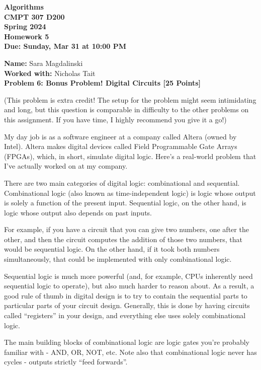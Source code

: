 \documentclass[12pt]{article}
\newcommand{\Name}[1]{\noindent \textbf{Name:} #1 \\}
\newcommand{\Workedwith}[1]{\noindent \textbf{Worked with:} #1 \\}
\newcommand{\Problem}[3]{\mbox{} \newline \noindent \textbf{\textbf{Problem #1: #2 [#3 Points] \\ }}}
\begin{document}
\begin{center}
  \bf
  Algorithms \\
  CMPT 307 D200 \\
  Spring 2024 \\
  \rm
  Homework 5\\
  Due:  Sunday, Mar 31 at 10:00 PM \\
\end{center}

\Name{Sara Magdalinski}
\Workedwith{Nicholas Tait}

\Problem{6}{Bonus Problem! Digital Circuits}{25}

(This problem is extra credit! The setup for the problem might seem intimidating and long, but this question is comparable in difficulty to the other problems on this assignment. If you have time, I highly recommend you give it a go!)

My day job is as a software engineer at a company called Altera (owned by Intel).
Altera makes digital devices called Field Programmable Gate Arrays (FPGAs), which, in short, simulate digital logic.
Here's a real-world problem that I've actually worked on at my company.

There are two main categories of digital logic: combinational and sequential.
Combinational logic (also known as time-independent logic) is logic whose output is solely a function of the present input.
Sequential logic, on the other hand, is logic whose output also depends on past inputs.

For example, if you have a circuit that you can give two numbers, one after the other, and then the circuit computes the addition of those two numbers, that would be sequential logic. On the other hand, if it took both numbers simultaneously, that could be implemented with only combinational logic.

Sequential logic is much more powerful (and, for example, CPUs inherently need sequential logic to operate), but also much harder to reason about. As a result, a good rule of thumb in digital design is to try to contain the sequential parts to particular parts of your circuit design. Generally, this is done by having circuits called ``registers'' in your design, and everything else uses solely combinational logic.

The main building blocks of combinational logic are logic gates you're probably familiar with - AND, OR, NOT, etc.
Note also that combinational logic never has cycles - outputs strictly ``feed forwards''.
\end{document}
